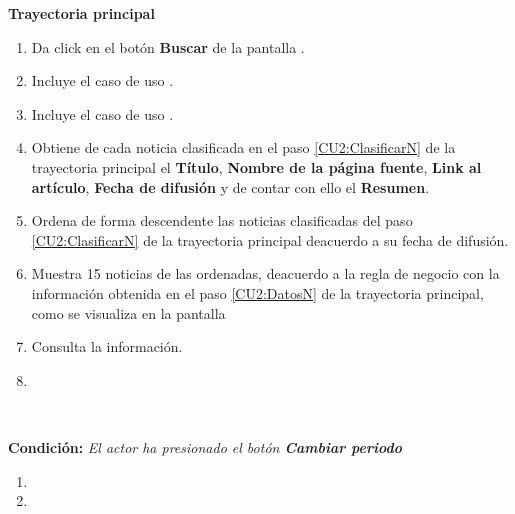 \begin{large}
\textbf{Trayectoria principal}\\
\end{large}	

\begin{enumerate}[1.]

\item \actor Da click en el botón \textbf{Buscar} de la pantalla . 

\item \sistema Incluye el caso de uso .

\item \sistema \label{CU2:ClasificarN}Incluye el caso de uso .

\item \sistema \label{CU2:DatosN}Obtiene de cada noticia clasificada en el paso \ref{CU2:ClasificarN} de la trayectoria principal el \textbf{Título}, \textbf{Nombre de la página fuente}, \textbf{Link al artículo}, \textbf{Fecha de difusión} y de contar con ello el \textbf{Resumen}.

\item \sistema \label{CU2:OrdenaN}Ordena de forma descendente las noticias clasificadas del paso \ref{CU2:ClasificarN} de la trayectoria principal deacuerdo a su fecha de difusión.

\item \sistema Muestra 15 noticias de las ordenadas, deacuerdo a la regla de negocio  con la información obtenida en el paso \ref{CU2:DatosN} de la trayectoria principal, como se visualiza en la pantalla  

\item \actor \label{CU2:Consulta}Consulta la información.

\item \finCU	
\end{enumerate}


\begin{large}
\\
\end{large}	
\textbf{Condición:} \textit{El actor ha presionado el botón \textbf{Cambiar periodo}}

\begin{enumerate}[{A-}1.]

\item \sistema 
\item \finCU	

\end{enumerate}



